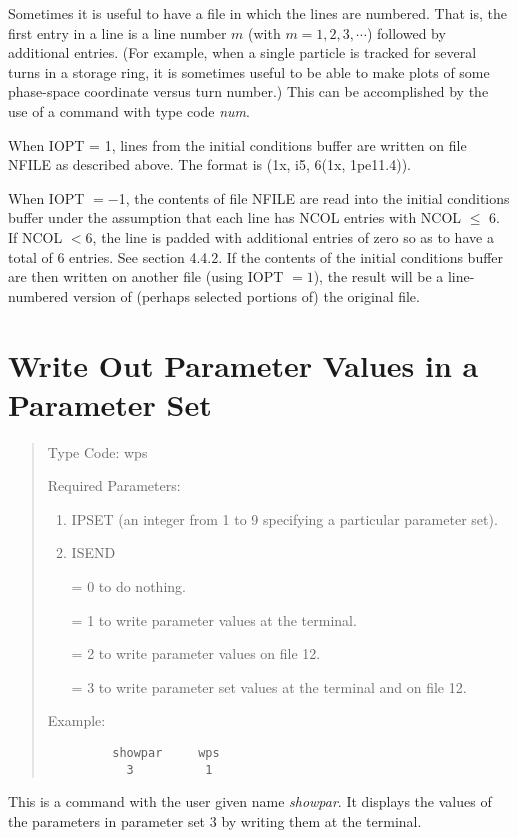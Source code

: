       Sometimes it is useful to have a file in which the lines are numbered.  That is, the first entry in a line is a line number $m$ (with $m = 1, 2, 3, \cdots $) followed by additional entries.  (For example, when a single particle is tracked for several turns in a storage ring, it is sometimes useful to be able to make plots of some phase-space coordinate versus turn number.)  This can be accomplished by the use of a command with type code {\em num}.

      When IOPT = 1, lines from the initial conditions buffer are written on file NFILE as described above.  The format is (1x, i5, 6(1x, 1pe11.4)).

      When IOPT $= -$1, the contents of file NFILE are read into the initial conditions  buffer under the assumption that each line has NCOL entries with NCOL $\leq$ 6.  If NCOL $< 6$, the line is padded with additional entries of zero so as to have a total of 6 entries.  See section 4.4.2.  If the contents of the initial conditions buffer are then written on another file (using IOPT $= 1$), the result will be a line-numbered version of (perhaps selected portions of) the original file.

\newpage
\section{Write Out Parameter Values in a Parameter Set}
\begin{quotation}
\noindent     Type Code:  wps 
\vspace{5mm}

\noindent     Required Parameters:
\begin{enumerate}
      \item  IPSET (an integer from 1 to 9 specifying a particular
             parameter set).

      \item  ISEND

             = 0 to do nothing.

             = 1 to write parameter values at the terminal.

             = 2 to write parameter values on file 12.

             = 3 to write parameter set values at the terminal and on
			 file 12.
\end{enumerate}

\vspace{5mm}
\noindent Example:
\begin{verbatim}
         showpar     wps
           3          1
\end{verbatim}
\end{quotation}
This is a command with the user given name {\em showpar}.  It displays
the values of the parameters in parameter set 3 by writing them at the
terminal.

